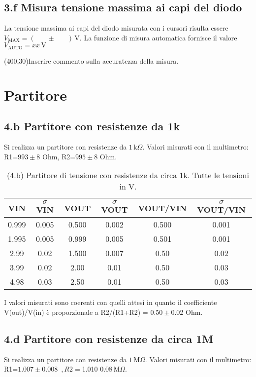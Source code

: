 \documentclass[10pt,a4paper]{article}
\newcommand{\exn}{\phantom{xxx}}
\begin{document}
\subsection*{3.f Misura tensione massima ai capi del diodo}
\par 
La tensione massima ai capi del diodo misurata con i cursori risulta essere $V_{\mathrm{MAX}}= ( \exn \pm \exn ) \,\mathrm{V}$. La funzione di misura automatica fornisce il valore $V_{\mathrm{AUTO}}= xx \,\mathrm{V}$

\vspace{0.5cm} 
\framebox(400,30){Inserire commento sulla accuratezza della misura.}






\section{Partitore}

\subsection*{4.b Partitore con resistenze da 1k}


Si realizza un partitore con resistenze da $1 \,\mathrm{k}\Omega$. Valori misurati con il multimetro: R1=$993 \pm $8 Ohm, R2=$995 \pm $8 Ohm.


\begin{table}[h]
\centering
\begin{tabular}{|c|c|c|c|c|c|}
\hline 
VIN& $\sigma$ VIN  &VOUT	 & $\sigma$ VOUT& VOUT/VIN & $\sigma$ VOUT/VIN \\
\hline 
0.999 & 0.005 & 0.500 & 0.002 & 0.500 & 0.001 \\
1.995 & 0.005 & 0.999 & 0.005 & 0.501 & 0.001 \\
2.99 & 0.02 & 1.500 & 0.007 & 0.50 & 0.02 \\
3.99 & 0.02 & 2.00 & 0.01 & 0.50 & 0.03 \\
4.98 & 0.03 & 2.50 & 0.01 & 0.50 & 0.03 \\
\hline 
\end{tabular} 
\caption{(4.b) Partitore di tensione con resistenze da circa 1k. Tutte le tensioni in V.\label{t:par1}}
\end{table}

I valori misurati sono coerenti con quelli attesi in quanto il coefficiente V(out)/V(in) è proporzionale a R2/(R1+R2) = $0.50 \pm $0.02 Ohm.


\subsection*{4.d Partitore con resistenze da circa 1M}
\par
Si realizza un partitore con resistenze da $1 \,\mathrm{M}\Omega$. Valori misurati con il multimetro: R1=$1.007 \pm $0.008 \,\Omega$, R2=$1.010 \pm $0.08 \,\mathrm{M}\Omega$.
\end{document}
